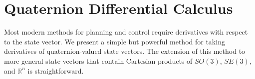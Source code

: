\documentclass[letterpaper, 10 pt, conference]{ieeeconf}  %
\newcommand{\R}{\mathbb{R}}
\newcommand{\q}{\textbf{q}}
\begin{document}
        

\section{Quaternion Differential Calculus} \label{sec:Quaternion_Calculus}
    Most modern methods for planning and control require derivatives with respect to the
    state vector. We present a simple but powerful method for taking derivatives of 
    quaternion-valued state vectors. The extension of this method to more general state vectors that contain Cartesian products of $SO(3)$, $SE(3)$, and $\mathbb{R}^n$ is straightforward.
\end{document}
